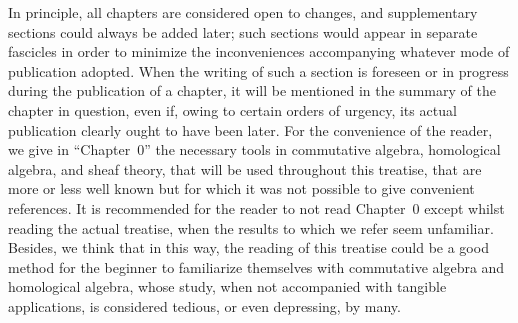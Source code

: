 \bigskip

In principle, all chapters are considered open to changes, and supplementary sections could always be added later;
such sections would appear in separate fascicles in order to minimize the inconveniences accompanying whatever mode of publication adopted.
When the writing of such a section is foreseen or in progress during the publication of a chapter, it will be mentioned in the summary of the chapter in question, even if, owing to certain orders of urgency, its actual publication clearly ought to have been later.
For the convenience of the reader, we give in ``Chapter~0'' the necessary tools in commutative algebra, homological algebra, and sheaf theory, that will be used throughout this treatise, that are more or less well known but for which it was not possible to give convenient references.
It is recommended for the reader to not read Chapter~0 except whilst reading the actual treatise, when the results to which we refer
seem unfamiliar.
Besides, we think that in this way, the reading of this treatise could be a good method for the beginner to familiarize themselves with commutative algebra and homological algebra, whose study, when not accompanied with tangible applications, is considered tedious, or even depressing, by many.

\sectionbreak

